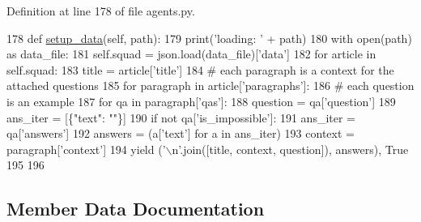 Definition at line 178 of file agents.\+py.


\begin{DoxyCode}
178     \textcolor{keyword}{def }\hyperlink{namespaceparlai_1_1tasks_1_1multinli_1_1agents_a4fa2cb0ba1ed745336ad8bceed36b841}{setup\_data}(self, path):
179         print(\textcolor{stringliteral}{'loading: '} + path)
180         with open(path) \textcolor{keyword}{as} data\_file:
181             self.squad = json.load(data\_file)[\textcolor{stringliteral}{'data'}]
182         \textcolor{keywordflow}{for} article \textcolor{keywordflow}{in} self.squad:
183             title = article[\textcolor{stringliteral}{'title'}]
184             \textcolor{comment}{# each paragraph is a context for the attached questions}
185             \textcolor{keywordflow}{for} paragraph \textcolor{keywordflow}{in} article[\textcolor{stringliteral}{'paragraphs'}]:
186                 \textcolor{comment}{# each question is an example}
187                 \textcolor{keywordflow}{for} qa \textcolor{keywordflow}{in} paragraph[\textcolor{stringliteral}{'qas'}]:
188                     question = qa[\textcolor{stringliteral}{'question'}]
189                     ans\_iter = [\{\textcolor{stringliteral}{"text"}: \textcolor{stringliteral}{""}\}]
190                     \textcolor{keywordflow}{if} \textcolor{keywordflow}{not} qa[\textcolor{stringliteral}{'is\_impossible'}]:
191                         ans\_iter = qa[\textcolor{stringliteral}{'answers'}]
192                     answers = (a[\textcolor{stringliteral}{'text'}] \textcolor{keywordflow}{for} a \textcolor{keywordflow}{in} ans\_iter)
193                     context = paragraph[\textcolor{stringliteral}{'context'}]
194                     \textcolor{keywordflow}{yield} (\textcolor{stringliteral}{'\(\backslash\)n'}.join([title, context, question]), answers), \textcolor{keyword}{True}
195 
196 
\end{DoxyCode}


\subsection{Member Data Documentation}
\mbox{\label{classparlai_1_1tasks_1_1squad2_1_1agents_1_1TitleTeacher_a7c29404ea09cd71791d48377d35d8e6d}} 
